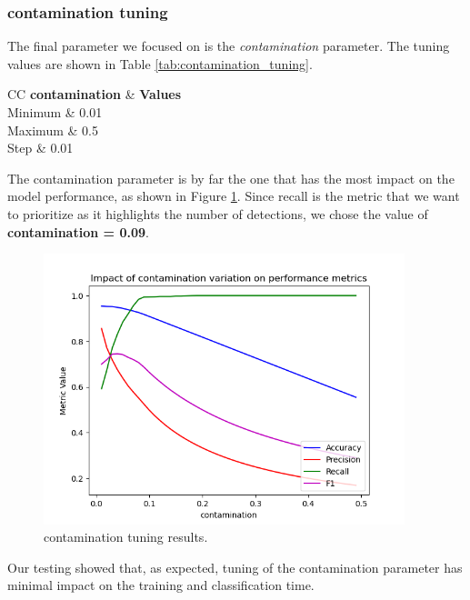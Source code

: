 \documentclass[futureinternet,article,submit,pdftex,moreauthors]{Definitions/mdpi}
\begin{document}
\subsubsection{contamination tuning}

The final parameter we focused on is the \textit{contamination} parameter. The tuning values are shown in Table \ref{tab:contamination_tuning}.

\begin{table}[H]
	\caption{contamination tuning values.}\label{tab:contamination_tuning}
	\begin{tabularx}{\textwidth}{CC}
	\toprule
	\textbf{contamination} & \textbf{Values} \\
	\midrule
	Minimum & 0.01 \\
	Maximum & 0.5 \\
	Step & 0.01 \\
	\bottomrule
	\end{tabularx}
\end{table}

The contamination parameter is by far the one that has the most impact on the model performance, as shown in Figure \ref{fig:contamination_tuning}.
Since recall is the metric that we want to prioritize as it highlights the number of detections, we chose the value of \textbf{contamination = 0.09}.

\begin{figure}[H]
	\includegraphics[width=10.5cm]{img/contaminationTuning.png}
	\caption{contamination tuning results.}\label{fig:contamination_tuning}
\end{figure}
\unskip

Our testing showed that, as expected, tuning of the contamination parameter has minimal impact on the training and classification time. 
\end{document}
